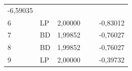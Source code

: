 \documentclass[]{article}
\begin{document}
\begin{longtable}[]{@{}llll@{}}
\begin{minipage}[t]{0.22\columnwidth}
{-6,59035}\strut
\end{minipage}\tabularnewline
\begin{minipage}[t]{0.22\columnwidth}\raggedright\strut
{6}\strut
\end{minipage} & \begin{minipage}[t]{0.22\columnwidth}\raggedright\strut
{LP}\strut
\end{minipage} & \begin{minipage}[t]{0.22\columnwidth}\raggedright\strut
{2,00000 ~ ~}\strut
\end{minipage} & \begin{minipage}[t]{0.22\columnwidth}\raggedright\strut
{-0,83012}\strut
\end{minipage}\tabularnewline
\begin{minipage}[t]{0.22\columnwidth}\raggedright\strut
{7}\strut
\end{minipage} & \begin{minipage}[t]{0.22\columnwidth}\raggedright\strut
{BD}\strut
\end{minipage} & \begin{minipage}[t]{0.22\columnwidth}\raggedright\strut
{1,99852}\strut
\end{minipage} & \begin{minipage}[t]{0.22\columnwidth}\raggedright\strut
{-0,76027}\strut
\end{minipage}\tabularnewline
\begin{minipage}[t]{0.22\columnwidth}\raggedright\strut
{8}\strut
\end{minipage} & \begin{minipage}[t]{0.22\columnwidth}\raggedright\strut
{BD}\strut
\end{minipage} & \begin{minipage}[t]{0.22\columnwidth}\raggedright\strut
{1,99852}\strut
\end{minipage} & \begin{minipage}[t]{0.22\columnwidth}\raggedright\strut
{-0,76027}\strut
\end{minipage}\tabularnewline
\begin{minipage}[t]{0.22\columnwidth}\raggedright\strut
{9}\strut
\end{minipage} & \begin{minipage}[t]{0.22\columnwidth}\raggedright\strut
{LP}\strut
\end{minipage} & \begin{minipage}[t]{0.22\columnwidth}\raggedright\strut
{2,00000 ~ ~}\strut
\end{minipage} & \begin{minipage}[t]{0.22\columnwidth}\raggedright\strut
{-0,39732}\strut
\end{minipage}\tabularnewline
\bottomrule
\end{longtable}
\end{document}
